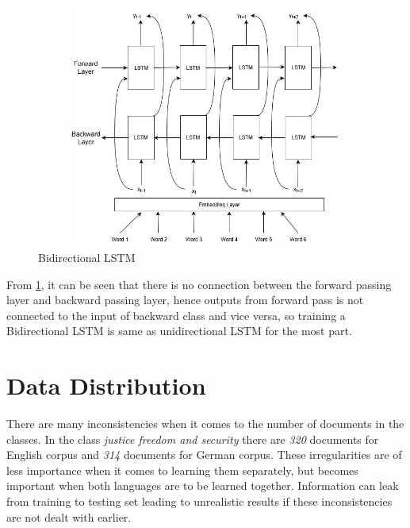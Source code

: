 \begin{figure}[!ht]
    \centering
    \includegraphics[width=12cm,height=8cm,keepaspectratio]{pics/BiLSTM.jpg}
    \captionsetup{justification=centering,margin=2cm}
    \caption{Bidirectional LSTM }
    \label{fig:BiLSTM}
\end{figure}

From \ref{fig:BiLSTM}, it can be seen that there is no connection between the forward passing layer and backward passing layer, hence outputs from forward pass is not connected to the input of backward class and vice versa, so training a Bidirectional LSTM is same as unidirectional LSTM for the most part.

\section{Data Distribution}
There are many inconsistencies when it comes to the number of documents in the classes. In the class \textit{justice freedom and security} there are \textit{320} documents for English corpus and \textit{314} documents for German corpus. These irregularities are of less importance when it comes to learning them separately, but becomes important when both languages are to be learned together. Information can leak from training to testing set leading to unrealistic results if these inconsistencies are not dealt with earlier. 

